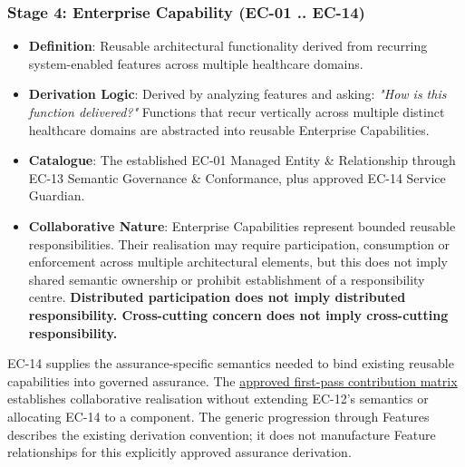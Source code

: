 \subsubsection*{Stage 4: Enterprise Capability (EC-01 .. EC-14)}
\label{rad:tier-model:130}

\begin{itemize}

\item
\textbf{Definition}: Reusable architectural functionality derived from recurring system-enabled features across multiple healthcare domains.



\item
\textbf{Derivation Logic}: Derived by analyzing features and asking: \emph{"How is this function delivered?"} Functions that recur vertically across multiple distinct healthcare domains are abstracted into reusable Enterprise Capabilities.



\item
\textbf{Catalogue}: The established EC-01 Managed Entity \& Relationship through EC-13 Semantic Governance \& Conformance, plus approved EC-14 Service Guardian.



\item
\textbf{Collaborative Nature}: Enterprise Capabilities represent bounded reusable responsibilities. Their realisation may require participation, consumption or enforcement across multiple architectural elements, but this does not imply shared semantic ownership or prohibit establishment of a responsibility centre. \textbf{Distributed participation does not imply distributed responsibility. Cross-cutting concern does not imply cross-cutting responsibility.}



\end{itemize}
\label{rad:tier-model:135}

EC-14 supplies the assurance-specific semantics needed to bind existing reusable capabilities into governed assurance. The \hyperref[rad:assurance-strategy:54]{approved first-pass contribution matrix} establishes collaborative realisation without extending EC-12's semantics or allocating EC-14 to a component. The generic progression through Features describes the existing derivation convention; it does not manufacture Feature relationships for this explicitly approved assurance derivation.

\label{rad:tier-model:137}
